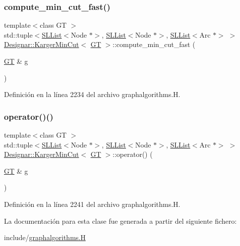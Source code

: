\subsubsection{\texorpdfstring{compute\+\_\+min\+\_\+cut\+\_\+fast()}{compute\_min\_cut\_fast()}}
{\footnotesize\ttfamily template$<$class GT $>$ \\
std\+::tuple$<$\hyperlink{class_designar_1_1_s_l_list}{S\+L\+List}$<$Node $\ast$$>$, \hyperlink{class_designar_1_1_s_l_list}{S\+L\+List}$<$Node $\ast$$>$, \hyperlink{class_designar_1_1_s_l_list}{S\+L\+List}$<$Arc $\ast$$>$ $>$ \hyperlink{class_designar_1_1_karger_min_cut}{Designar\+::\+Karger\+Min\+Cut}$<$ \hyperlink{demo-buildgraph_8_c_a3001c40d2c31ca87ed96cd7d1334a55e}{GT} $>$\+::compute\+\_\+min\+\_\+cut\+\_\+fast (\begin{DoxyParamCaption}\item[{\hyperlink{demo-buildgraph_8_c_a3001c40d2c31ca87ed96cd7d1334a55e}{GT} \&}]{g }\end{DoxyParamCaption})\hspace{0.3cm}{\ttfamily [inline]}}



Definición en la línea 2234 del archivo graphalgorithms.\+H.

\mbox{\label{class_designar_1_1_karger_min_cut_a733802123d2510126abd4238688432ca}} 
\subsubsection{\texorpdfstring{operator()()}{operator()()}}
{\footnotesize\ttfamily template$<$class GT $>$ \\
std\+::tuple$<$\hyperlink{class_designar_1_1_s_l_list}{S\+L\+List}$<$Node $\ast$$>$, \hyperlink{class_designar_1_1_s_l_list}{S\+L\+List}$<$Node $\ast$$>$, \hyperlink{class_designar_1_1_s_l_list}{S\+L\+List}$<$Arc $\ast$$>$ $>$ \hyperlink{class_designar_1_1_karger_min_cut}{Designar\+::\+Karger\+Min\+Cut}$<$ \hyperlink{demo-buildgraph_8_c_a3001c40d2c31ca87ed96cd7d1334a55e}{GT} $>$\+::operator() (\begin{DoxyParamCaption}\item[{\hyperlink{demo-buildgraph_8_c_a3001c40d2c31ca87ed96cd7d1334a55e}{GT} \&}]{g }\end{DoxyParamCaption})\hspace{0.3cm}{\ttfamily [inline]}}



Definición en la línea 2241 del archivo graphalgorithms.\+H.



La documentación para esta clase fue generada a partir del siguiente fichero\+:\begin{DoxyCompactItemize}
\item 
include/\hyperlink{graphalgorithms_8_h}{graphalgorithms.\+H}\end{DoxyCompactItemize}
